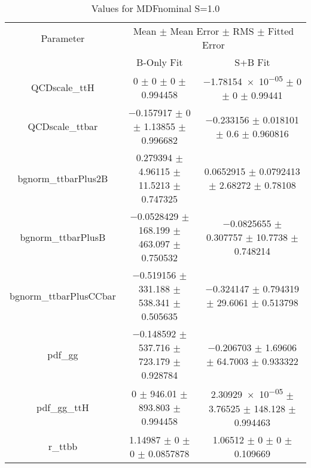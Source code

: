 \begin{table}
\centering
\caption{Values for MDFnominal S=1.0}
\begin{tabular}{ccc}
\toprule
Parameter & \multicolumn{2}{c}{Mean $\pm$ Mean Error $\pm$ RMS $\pm$ Fitted Error}\\
 & B-Only Fit & S+B Fit\\
\midrule
QCDscale\_ttH & \num{0} $\pm$ \num{0} $\pm$ \num{0} $\pm$ \num{0.994458} & \num{-1.78154e-05} $\pm$ \num{0} $\pm$ \num{0} $\pm$ \num{0.99441}\\
QCDscale\_ttbar & \num{-0.157917} $\pm$ \num{0} $\pm$ \num{1.13855} $\pm$ \num{0.996682} & \num{-0.233156} $\pm$ \num{0.018101} $\pm$ \num{0.6} $\pm$ \num{0.960816}\\
bgnorm\_ttbarPlus2B & \num{0.279394} $\pm$ \num{4.96115} $\pm$ \num{11.5213} $\pm$ \num{0.747325} & \num{0.0652915} $\pm$ \num{0.0792413} $\pm$ \num{2.68272} $\pm$ \num{0.78108}\\
bgnorm\_ttbarPlusB & \num{-0.0528429} $\pm$ \num{168.199} $\pm$ \num{463.097} $\pm$ \num{0.750532} & \num{-0.0825655} $\pm$ \num{0.307757} $\pm$ \num{10.7738} $\pm$ \num{0.748214}\\
bgnorm\_ttbarPlusCCbar & \num{-0.519156} $\pm$ \num{331.188} $\pm$ \num{538.341} $\pm$ \num{0.505635} & \num{-0.324147} $\pm$ \num{0.794319} $\pm$ \num{29.6061} $\pm$ \num{0.513798}\\
pdf\_gg & \num{-0.148592} $\pm$ \num{537.716} $\pm$ \num{723.179} $\pm$ \num{0.928784} & \num{-0.206703} $\pm$ \num{1.69606} $\pm$ \num{64.7003} $\pm$ \num{0.933322}\\
pdf\_gg\_ttH & \num{0} $\pm$ \num{946.01} $\pm$ \num{893.803} $\pm$ \num{0.994458} & \num{2.30929e-05} $\pm$ \num{3.76525} $\pm$ \num{148.128} $\pm$ \num{0.994463}\\
r\_ttbb & \num{1.14987} $\pm$ \num{0} $\pm$ \num{0} $\pm$ \num{0.0857878} & \num{1.06512} $\pm$ \num{0} $\pm$ \num{0} $\pm$ \num{0.109669}\\
\bottomrule
\end{tabular}
\end{table}